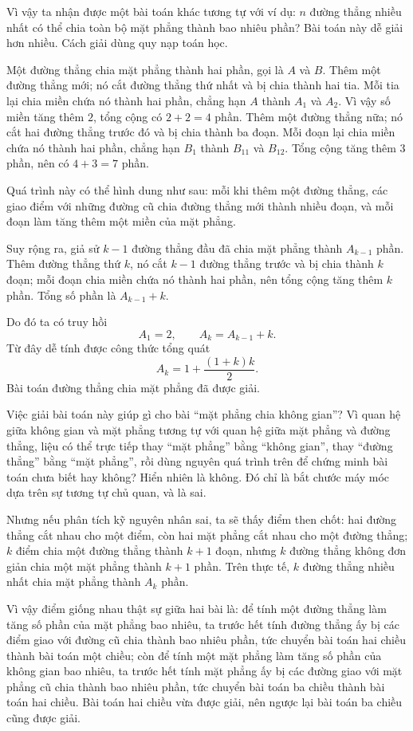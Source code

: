 \documentclass[11pt]{article}
\begin{document}
Vì vậy ta nhận được một bài toán khác tương tự với ví dụ: \(n\) đường thẳng
nhiều nhất có thể chia toàn bộ mặt phẳng thành bao nhiêu phần? Bài toán này
dễ giải hơn nhiều. Cách giải dùng quy nạp toán học.

Một đường thẳng chia mặt phẳng thành hai phần, gọi là \(A\) và \(B\). Thêm một
đường thẳng mới; nó cắt đường thẳng thứ nhất và bị chia thành hai tia. Mỗi tia
lại chia miền chứa nó thành hai phần, chẳng hạn \(A\) thành \(A_1\) và
\(A_2\). Vì vậy số miền tăng thêm \(2\), tổng cộng có \(2+2=4\) phần. Thêm
một đường thẳng nữa; nó cắt hai đường thẳng trước đó và bị chia thành ba
đoạn. Mỗi đoạn lại chia miền chứa nó thành hai phần, chẳng hạn \(B_1\) thành
\(B_{11}\) và \(B_{12}\). Tổng cộng tăng thêm \(3\) phần, nên có
\(4+3=7\) phần.

Quá trình này có thể hình dung như sau: mỗi khi thêm một đường thẳng, các giao
điểm với những đường cũ chia đường thẳng mới thành nhiều đoạn, và mỗi đoạn làm
tăng thêm một miền của mặt phẳng.

Suy rộng ra, giả sử \(k-1\) đường thẳng đầu đã chia mặt phẳng thành
\(A_{k-1}\) phần. Thêm đường thẳng thứ \(k\), nó cắt \(k-1\) đường thẳng trước
và bị chia thành \(k\) đoạn; mỗi đoạn chia miền chứa nó thành hai phần, nên
tổng cộng tăng thêm \(k\) phần. Tổng số phần là \(A_{k-1}+k\).

Do đó ta có truy hồi
\[
  A_1=2,\qquad A_k=A_{k-1}+k.
\]
Từ đây dễ tính được công thức tổng quát
\[
  A_k=1+\frac{(1+k)k}{2}.
\]
Bài toán đường thẳng chia mặt phẳng đã được giải.

Việc giải bài toán này giúp gì cho bài ``mặt phẳng chia không gian''? Vì quan
hệ giữa không gian và mặt phẳng tương tự với quan hệ giữa mặt phẳng và đường
thẳng, liệu có thể trực tiếp thay ``mặt phẳng'' bằng ``không gian'', thay
``đường thẳng'' bằng ``mặt phẳng'', rồi dùng nguyên quá trình trên để chứng
minh bài toán chưa biết hay không? Hiển nhiên là không. Đó chỉ là bắt chước
máy móc dựa trên sự tương tự chủ quan, và là sai.

Nhưng nếu phân tích kỹ nguyên nhân sai, ta sẽ thấy điểm then chốt: hai đường
thẳng cắt nhau cho một điểm, còn hai mặt phẳng cắt nhau cho một đường thẳng;
\(k\) điểm chia một đường thẳng thành \(k+1\) đoạn, nhưng \(k\) đường thẳng
không đơn giản chia một mặt phẳng thành \(k+1\) phần. Trên thực tế, \(k\)
đường thẳng nhiều nhất chia mặt phẳng thành \(A_k\) phần.

Vì vậy điểm giống nhau thật sự giữa hai bài là: để tính một đường thẳng làm
tăng số phần của mặt phẳng bao nhiêu, ta trước hết tính đường thẳng ấy bị các
điểm giao với đường cũ chia thành bao nhiêu phần, tức chuyển bài toán hai
chiều thành bài toán một chiều; còn để tính một mặt phẳng làm tăng số phần của
không gian bao nhiêu, ta trước hết tính mặt phẳng ấy bị các đường giao với mặt
phẳng cũ chia thành bao nhiêu phần, tức chuyển bài toán ba chiều thành bài
toán hai chiều. Bài toán hai chiều vừa được giải, nên ngược lại bài toán ba
chiều cũng được giải.
\end{document}
